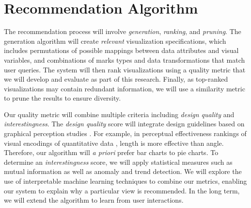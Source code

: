 \section*{Recommendation Algorithm}

The recommendation process will involve \textit{generation}, \textit{ranking}, and \textit{pruning}.
The generation algorithm will create \textit{relevant} visualization specifications,
which includes permutations of possible mappings between data attributes and visual variables,
and combinations of marks types and data transformations that match user queries.
The system will then rank visualizations using a quality metric that we will develop and evaluate as part of this research.
Finally, as top-ranked visualizations may contain redundant information, we will use a similarity metric to prune the results to ensure diversity.

Our quality metric will combine multiple criteria including \textit{design quality} and \textit{interestingness}. The \textit{design quality} score will integrate design guidelines based on graphical perception studies \cite{cleveland:perception}.  For example, in perceptual effectiveness rankings of visual encodings of quantitative data \cite{mackinlay:apt}, length is more effective than angle.  Therefore, our algorithm will \textit{a priori} prefer bar charts to pie charts.  To determine an \textit{interestingness} score, we will apply statistical measures such as mutual information\cite{wang:maximum} as well as anomaly and trend detection\cite{chandola:anomaly}. We will explore the use of interpretable machine learning techniques \cite{letham:interpretable} to combine our metrics, enabling our system to explain why a particular view is recommended. In the long term, we will extend the algorithm to learn from user interactions.